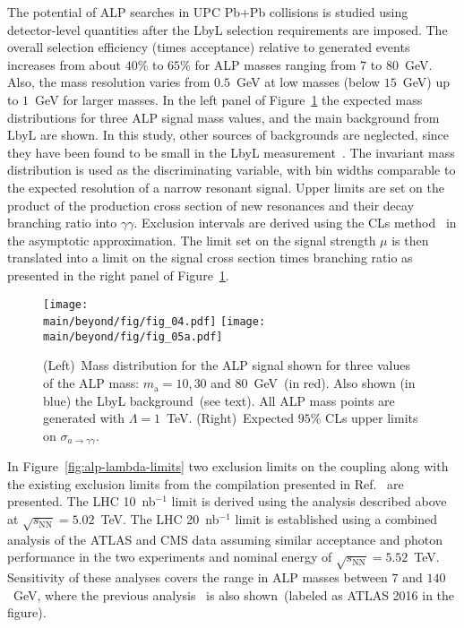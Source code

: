 The potential of ALP searches in UPC Pb+Pb collisions is studied using detector-level quantities after the LbyL selection requirements are imposed. The overall selection efficiency (times acceptance) relative to generated events increases from about $40$\% to $65$\% for ALP masses ranging from $7$ to $80$~GeV. Also, the mass resolution varies from $0.5$~GeV at low masses (below $15$~GeV) up to $1$~GeV for larger masses. In the left panel of Figure~\ref{fig:alp} the expected mass distributions for three ALP signal mass values, and the main background from LbyL are shown. In this study, other sources of backgrounds are neglected, since they have been found to be small in the LbyL measurement~\cite{Aaboud:2017bwk}. The invariant mass distribution is used as the discriminating variable, with bin widths comparable to the expected resolution of a narrow resonant signal.
Upper limits are set on the product of the production cross section of
new resonances and their decay branching ratio into $\gamma
\gamma$. Exclusion intervals are derived using the CLs method~\cite{Read:2002hq} in the asymptotic approximation. The limit set on the signal strength $\mu$ is then translated into a limit on the signal cross section times branching ratio as presented in the right panel of Figure~\ref{fig:alp}.
\begin{figure}[!htbp]
\centering
  \texttt{[image: \\main/beyond/fig/fig\_04.pdf]}
  \texttt{[image: \\main/beyond/fig/fig\_05a.pdf]}
  \caption{(Left)~Mass distribution for the ALP signal
  shown for three values of the ALP mass: $m_\mathrm{a}=10, 30$ and
  $80$~GeV~(in red). Also shown (in blue) the LbyL background~(see
  text). All ALP mass points are generated with $\Lambda = 1$~TeV.
  (Right)~Expected $95$\% CLs upper limits on $\sigma_{a\rightarrow \gamma \gamma}$.}
  \label{fig:alp}
\end{figure}

In Figure~\ref{fig:alp-lambda-limits} two exclusion limits on the coupling along with the existing exclusion limits from the compilation presented in Ref.~\cite{Baldenegro:2018hng} are presented. The LHC 10~nb$^{-1}$ limit is derived using the analysis described above at $\sqrt{s_{\mathrm{NN}}}=5.02$~TeV. The LHC 20~nb$^{-1}$ limit is established using a combined analysis of the ATLAS and CMS data assuming similar acceptance and photon performance in the two experiments and nominal energy of $\sqrt{s_{\mathrm{NN}}}=5.52$~TeV.
Sensitivity of these analyses covers the range in ALP masses between $7$ and $140$~GeV, where the previous analysis~\cite{Knapen:2016moh} is also shown~(labeled as ATLAS 2016 in the figure).

